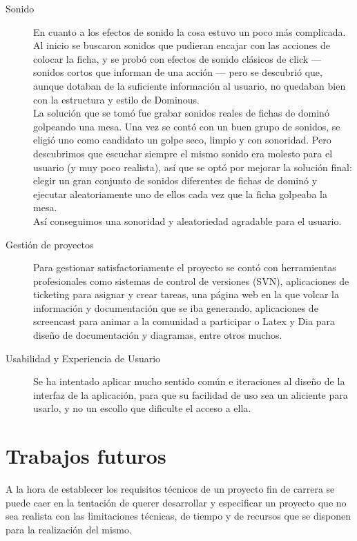 \begin{description}
    \item[Sonido] En cuanto a los efectos de sonido la cosa estuvo un poco más complicada. Al inicio se buscaron sonidos que
        pudieran encajar con las acciones de colocar la ficha, y se probó con efectos de sonido clásicos de click --- sonidos
        cortos que informan de una acción --- pero se descubrió que, aunque dotaban de la suficiente información
        al usuario, no quedaban bien con la estructura y estilo de Dominous. \\

        La solución que se tomó fue grabar sonidos reales de fichas de dominó golpeando una mesa. Una vez se contó con
        un buen grupo de sonidos, se eligió uno como candidato un golpe seco, limpio y con sonoridad. Pero descubrimos
        que escuchar siempre el mismo sonido era molesto para el usuario (y muy poco realista), así que se optó por mejorar
        la solución final: elegir un gran conjunto de sonidos diferentes de fichas de dominó y ejecutar aleatoriamente
        uno de ellos cada vez que la ficha golpeaba la mesa. \\
        
        Así conseguimos una sonoridad y aleatoriedad agradable para el usuario.
        
    \item[Gestión de proyectos] Para gestionar satisfactoriamente el proyecto se contó con herramientas profesionales
        como sistemas de control de versiones (SVN), aplicaciones de ticketing para asignar y crear tareas, una página
        web en la que volcar la información y documentación que se iba generando, aplicaciones de screencast para
        animar a la comunidad a participar o Latex y Dia para diseño de documentación y diagramas, entre otros muchos.

    \item[Usabilidad y Experiencia de Usuario] Se ha intentado aplicar mucho sentido común e iteraciones al diseño de la
        interfaz de la aplicación, para que su facilidad de uso sea un aliciente para usarlo, y no un escollo que
        dificulte el acceso a ella.

\end{description}

\section{Trabajos futuros}

A la hora de establecer los requisitos técnicos de un proyecto fin de carrera se puede caer en la tentación de querer desarrollar y
especificar un proyecto que no sea realista con las limitaciones técnicas, de tiempo y de recursos que se disponen para la
realización del mismo. \\

